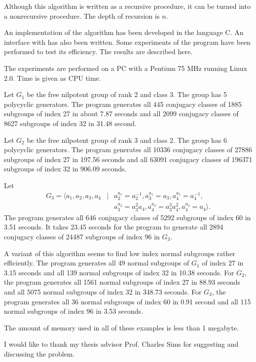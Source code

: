 \documentclass[12 pt]{article}
\begin{document}
Although this algorithm is written as a recursive procedure, it can
be turned into a nonrecursive procedure. The depth of recursion is $n$.

An implementation of the algorithm has been developed in the language C.
An interface with \cite{GAP}
has also been written. Some experiments of the
program have been performed to test its efficiency. The results are
described here.

The experiments are performed on a PC with a Pentium 75 MHz running
Linux 2.0. Time is given as CPU time.

Let $G_1$ be the free nilpotent group of rank
2 and class 3. The group has 5 polycyclic generators.
The program generates all 445 conjugacy classes
of 1885 subgroups of index 27 in about 7.87 seconds and all 2099 conjugacy
classes of 8627 subgroups of index 32 in 31.48 second.

Let $G_2$ be the free nilpotent group of rank 3 and class 2. The group has
6 polycyclic generators.
The program generates all 10336 conjugacy classes of 27886 subgroups
of index 27 in 197.56 seconds and
all 63091 conjugacy classes of 196371 subgroups of index 32
in 906.09 seconds.

Let
\begin{eqnarray*}
  G_3 = \langle a_1,a_2,a_3,a_4 & | & a_2^{a_1}=a_2^{-1},
  a_3^{a_1}=a_3, a_4^{a_1}=a_4^{-1},\\
                                &   & a_3^{a_2}=a_3^2a_4,
  a_4^{a_2}=a_3^3a_4^2, a_4^{a_3}=a_4\rangle.\end{eqnarray*}
The program generates all 646 conjugacy classes of 5292 subgroups of index 
60 in 3.51 seconds. It takes 23.45 seconds for
the program to generate all 2894 conjugacy classes of 24487 subgroups
of index 96 in $G_3$.

A variant of this algorithm seems to find low index normal subgroups
rather efficiently. The program generates all 49 normal subgroups of
$G_1$ of index 27 in 3.15 seconds and all 139 normal subgroups of
index 32 in 10.38 seconds. For $G_2$, the program generates all
1561 normal subgroups of index 27 in 88.93 seconds and all
5075 normal subgroups of index 32 in 348.73 seconds.
For $G_3$, the program generates all 36 normal subgroups of index 60
in 0.91 second and all 115 normal subgroups of index 96 in 3.53 seconds.

The amount of memory used in all of these examples is less than
1 megabyte.

I would like to thank my thesis advisor Prof. Charles Sims
for suggesting and discussing the problem.



\end{document}

